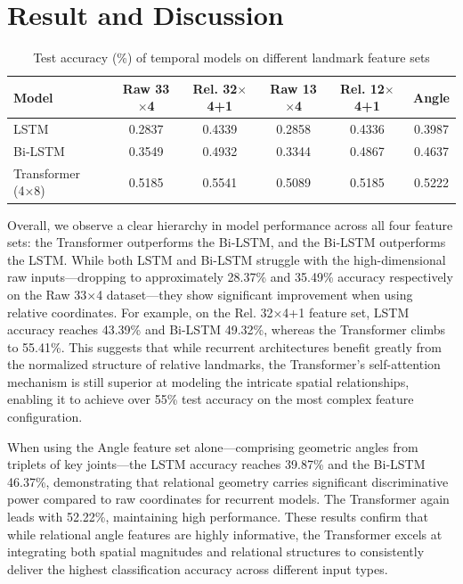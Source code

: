 \documentclass[journal,onecolumn, 11pt]{IEEEtran}
\begin{document}
\section{Result and Discussion}
\begin{table}[H]
\centering
\caption{Test accuracy (\%) of temporal models on different landmark feature sets}
\label{tab:accuracy-spatial-models}
\begin{tabular}{l c c c c c}
\hline
\textbf{Model}      & \textbf{Raw 33$\times$4} & \textbf{Rel. 32$\times$4+1} & \textbf{Raw 13$\times$4} & \textbf{Rel. 12$\times$4+1} & \textbf{Angle} \\
\hline
LSTM                & 0.2837                   & 0.4339                      & 0.2858                   & 0.4336                      & 0.3987        \\
Bi‐LSTM             & 0.3549                   & 0.4932                      & 0.3344                   & 0.4867                      & 0.4637        \\
Transformer (4×8)   & 0.5185                   & 0.5541                      & 0.5089                   & 0.5185                      & 0.5222        \\
\hline
\end{tabular}
\end{table}

Overall, we observe a clear hierarchy in model performance across all four feature sets: the Transformer outperforms the Bi‐LSTM, and the Bi‐LSTM outperforms the LSTM. While both LSTM and Bi-LSTM struggle with the high-dimensional raw inputs—dropping to approximately 28.37\% and 35.49\% accuracy respectively on the Raw 33×4 dataset—they show significant improvement when using relative coordinates. For example, on the Rel. 32×4+1 feature set, LSTM accuracy reaches 43.39\% and Bi-LSTM 49.32\%, whereas the Transformer climbs to 55.41\%. This suggests that while recurrent architectures benefit greatly from the normalized structure of relative landmarks, the Transformer’s self-attention mechanism is still superior at modeling the intricate spatial relationships, enabling it to achieve over 55\% test accuracy on the most complex feature configuration.

When using the Angle feature set alone—comprising geometric angles from triplets of key joints—the LSTM accuracy reaches 39.87\% and the Bi‐LSTM 46.37\%, demonstrating that relational geometry carries significant discriminative power compared to raw coordinates for recurrent models. The Transformer again leads with 52.22\%, maintaining high performance. These results confirm that while relational angle features are highly informative, the Transformer excels at integrating both spatial magnitudes and relational structures to consistently deliver the highest classification accuracy across different input types.
\end{document}
